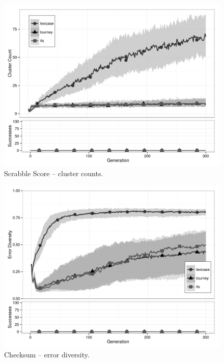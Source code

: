 \begin{figure}[p] %
\centering
\includegraphics[width=11.5cm]{scrabble-score-cluster.pdf}
\caption{Scrabble Score -- cluster counts.}
\label{scrabble-scoreClu}
\end{figure}

\begin{figure}[p] %
\centering
\includegraphics[width=11.5cm]{checksum-diversity.pdf}
\caption{Checksum -- error diversity.}
\label{checksumDiv}
\end{figure}

